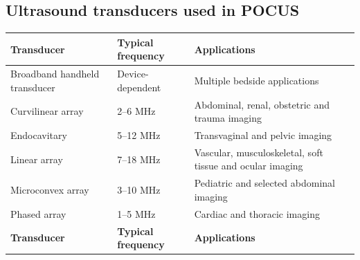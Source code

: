 \subsection{Ultrasound transducers used in POCUS}
\begin{longtable}{@{}p{}p{}p{}@{}}
\toprule
\textbf{Transducer} & \textbf{Typical frequency} & \textbf{Applications} \\
\midrule
\endfirsthead
\toprule
Broadband handheld transducer & Device-dependent & Multiple bedside applications \\
\midrule
\endhead
Curvilinear array & 2--6 MHz & Abdominal, renal, obstetric and trauma imaging \\
Endocavitary & 5--12 MHz & Transvaginal and pelvic imaging \\
Linear array & 7--18 MHz & Vascular, musculoskeletal, soft tissue and ocular imaging \\
Microconvex array & 3--10 MHz & Pediatric and selected abdominal imaging \\
Phased array & 1--5 MHz & Cardiac and thoracic imaging \\
\textbf{Transducer} & \textbf{Typical frequency} & \textbf{Applications} \\
\bottomrule
\end{longtable}

